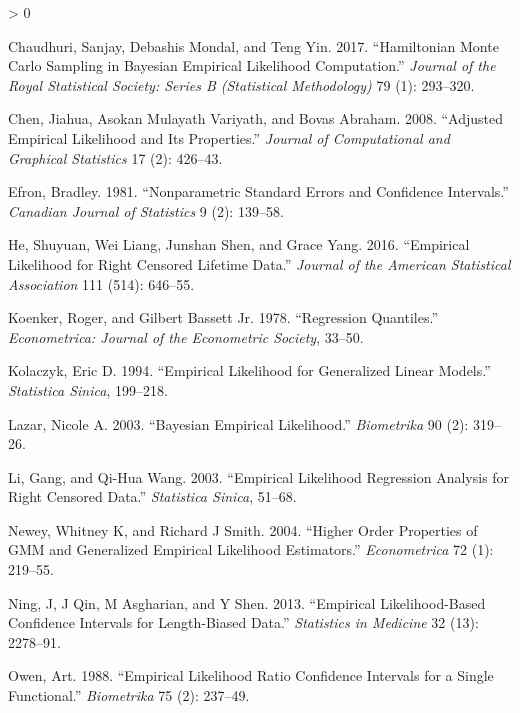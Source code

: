 \documentclass[article]{jss}
\newlength{\cslhangindent}
\newenvironment{CSLReferences}[2] %
 {%
  \setlength{\parindent}{0pt}
  \ifodd #1 \everypar{\setlength{\hangindent}{\cslhangindent}}\ignorespaces\fi
  \ifnum #2 > 0
  \setlength{\parskip}{#2\baselineskip}
  \fi
 }%
 {}
\renewcommand{\|}{\,|\,}
\begin{document}
\hypertarget{refs}{}
\begin{CSLReferences}{1}{0}
\leavevmode\hypertarget{ref-chaudhuri-et-al2017}{}%
Chaudhuri, Sanjay, Debashis Mondal, and Teng Yin. 2017. {``Hamiltonian Monte Carlo Sampling in Bayesian Empirical Likelihood Computation.''} \emph{Journal of the Royal Statistical Society: Series B (Statistical Methodology)} 79 (1): 293--320.

\leavevmode\hypertarget{ref-chen-et-al2008}{}%
Chen, Jiahua, Asokan Mulayath Variyath, and Bovas Abraham. 2008. {``Adjusted Empirical Likelihood and Its Properties.''} \emph{Journal of Computational and Graphical Statistics} 17 (2): 426--43.

\leavevmode\hypertarget{ref-efron1981}{}%
Efron, Bradley. 1981. {``Nonparametric Standard Errors and Confidence Intervals.''} \emph{Canadian Journal of Statistics} 9 (2): 139--58.

\leavevmode\hypertarget{ref-he-et-al2016}{}%
He, Shuyuan, Wei Liang, Junshan Shen, and Grace Yang. 2016. {``Empirical Likelihood for Right Censored Lifetime Data.''} \emph{Journal of the American Statistical Association} 111 (514): 646--55.

\leavevmode\hypertarget{ref-koenker-bassett1978}{}%
Koenker, Roger, and Gilbert Bassett Jr. 1978. {``Regression Quantiles.''} \emph{Econometrica: Journal of the Econometric Society}, 33--50.

\leavevmode\hypertarget{ref-kolaczyk1994}{}%
Kolaczyk, Eric D. 1994. {``Empirical Likelihood for Generalized Linear Models.''} \emph{Statistica Sinica}, 199--218.

\leavevmode\hypertarget{ref-lazar2003}{}%
Lazar, Nicole A. 2003. {``Bayesian Empirical Likelihood.''} \emph{Biometrika} 90 (2): 319--26.

\leavevmode\hypertarget{ref-li-wang2003}{}%
Li, Gang, and Qi-Hua Wang. 2003. {``Empirical Likelihood Regression Analysis for Right Censored Data.''} \emph{Statistica Sinica}, 51--68.

\leavevmode\hypertarget{ref-newey-smith2004}{}%
Newey, Whitney K, and Richard J Smith. 2004. {``Higher Order Properties of GMM and Generalized Empirical Likelihood Estimators.''} \emph{Econometrica} 72 (1): 219--55.

\leavevmode\hypertarget{ref-ning-et-al2013}{}%
Ning, J, J Qin, M Asgharian, and Y Shen. 2013. {``Empirical Likelihood-Based Confidence Intervals for Length-Biased Data.''} \emph{Statistics in Medicine} 32 (13): 2278--91.

\leavevmode\hypertarget{ref-owen1988}{}%
Owen, Art. 1988. {``Empirical Likelihood Ratio Confidence Intervals for a Single Functional.''} \emph{Biometrika} 75 (2): 237--49.


\end{CSLReferences}
\end{document}
